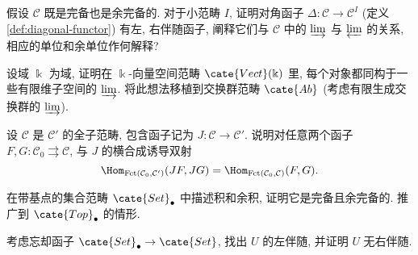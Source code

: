 \begin{Exercises}
	\item 假设 $\mathcal{C}$ 既是完备也是余完备的. 对于小范畴 $I$, 证明对角函子 $\Delta: \mathcal{C} \to \mathcal{C}^I$ (定义 \ref{def:diagonal-functor}) 有左, 右伴随函子, 阐释它们与 $\mathcal{C}$ 中的 $\varinjlim$ 与 $\varprojlim$ 的关系, 相应的单位和余单位作何解释?
	\item 设域 $\Bbbk$ 为域, 证明在 $\Bbbk$-向量空间范畴 $\cate{Vect}(\Bbbk)$ 里, 每个对象都同构于一些有限维子空间的 $\varinjlim$. 将此想法移植到交换群范畴 $\cate{Ab}$ (考虑有限生成交换群的 $\varinjlim$).
	\item 设 $\mathcal{C}$ 是 $\mathcal{C}'$ 的全子范畴, 包含函子记为 $J: \mathcal{C} \to \mathcal{C}'$. 说明对任意两个函子 $F, G: \mathcal{C}_0 \rightrightarrows \mathcal{C}$, 与 $J$ 的横合成诱导双射
		\[ \Hom_{\text{Fct}(\mathcal{C}_0, \mathcal{C}')}(JF, JG) = \Hom_{\text{Fct}(\mathcal{C}_0, \mathcal{C})}(F, G). \]
	\item 在带基点的集合范畴 $\cate{Set}_\bullet$ 中描述积和余积, 证明它是完备且余完备的. 推广到 $\cate{Top}_\bullet$ 的情形.
	\item 考虑忘却函子 $\cate{Set}_\bullet \to \cate{Set}$, 找出 $U$ 的左伴随, 并证明 $U$ 无右伴随.
\end{Exercises}
